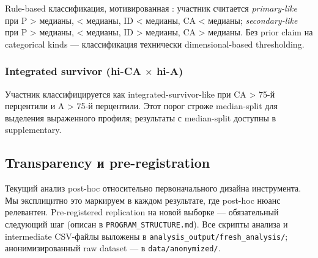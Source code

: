 Rule-based классификация, мотивированная \citet{karpman1941}: участник считается \emph{primary-like} при P > медианы, \EAF{} < медианы, ID < медианы, CA < медианы; \emph{secondary-like} при P > медианы, \EAF{} < медианы, ID > медианы, CA > медианы. Без prior claim на categorical kinds --- классификация технически dimensional-based thresholding.

\subsubsection{\texorpdfstring{Integrated survivor (hi-CA $\times$ hi-A)}{Integrated survivor (hi-CA x hi-A)}}

Участник классифицируется как integrated-survivor-like при CA > 75-й перцентили и A > 75-й перцентили. Этот порог строже median-split для выделения выраженного профиля; результаты с median-split доступны в supplementary.

\subsection{Transparency и pre-registration}

Текущий анализ post-hoc относительно первоначального дизайна инструмента. Мы эксплицитно это маркируем в каждом результате, где post-hoc нюанс релевантен. Pre-registered replication на новой выборке --- обязательный следующий шаг (описан в \texttt{PROGRAM\_STRUCTURE.md}). Все скрипты анализа и intermediate CSV-файлы выложены в \texttt{analysis\_output/fresh\_analysis/}; анонимизированный raw dataset --- в \texttt{data/anonymized/}.
